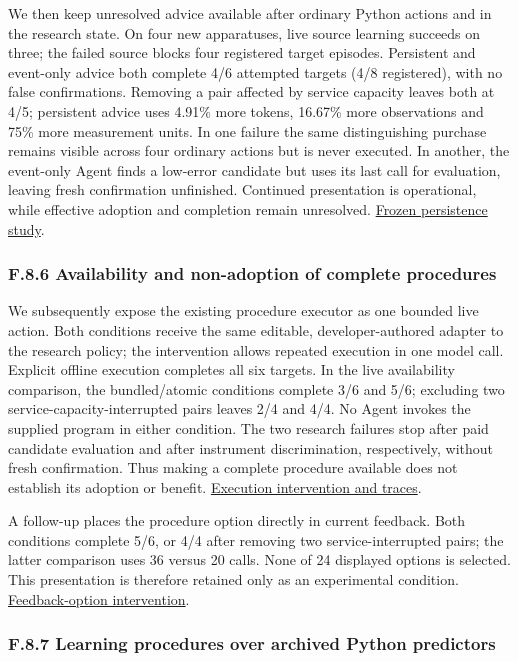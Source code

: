 \documentclass[11pt,a4paper]{article}
\begin{document}
We then keep unresolved advice available after ordinary Python actions and in
the research state. On four new apparatuses, live source learning succeeds on
three; the failed source blocks four registered target episodes. Persistent and
event-only advice both complete 4/6 attempted targets (4/8 registered), with no
false confirmations. Removing a pair affected by service capacity leaves both
at 4/5; persistent advice uses 4.91\% more tokens, 16.67\% more observations and
75\% more measurement units. In one failure the same distinguishing purchase
remains visible across four ordinary actions but is never executed. In another,
the event-only Agent finds a low-error candidate but uses its last call for
evaluation, leaving fresh confirmation unfinished. Continued presentation is
operational, while effective adoption and completion remain unresolved.
\hyperlink{artifact-84}{Frozen persistence study}.


\subsubsection*{F.8.6 Availability and non-adoption of complete procedures}

We subsequently expose the existing procedure executor as one bounded live action.
Both conditions receive the same editable, developer-authored adapter to the
research policy; the intervention allows repeated execution in one model call.
Explicit offline execution completes all six targets. In the live availability
comparison, the bundled/atomic conditions complete 3/6 and 5/6; excluding two
service-capacity-interrupted pairs leaves 2/4 and 4/4. No Agent invokes the supplied
program in either condition. The two research failures stop after paid candidate
evaluation and after instrument discrimination, respectively, without fresh
confirmation. Thus making a complete procedure available does not establish its
adoption or benefit. \hyperlink{artifact-85}{Execution intervention and traces}.


A follow-up places the procedure option directly in current feedback. Both
conditions complete 5/6, or 4/4 after removing two service-interrupted pairs;
the latter comparison uses 36 versus 20 calls. None of 24 displayed options is
selected. This presentation is therefore retained only as an experimental
condition. \hyperlink{artifact-86}{Feedback-option intervention}.


\subsubsection*{F.8.7 Learning procedures over archived Python predictors}
\end{document}
